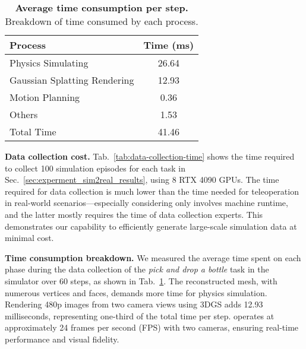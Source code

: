 \begin{table}[bt]
    \caption{\textbf{Average time consumption per step.} Breakdown of time consumed by each process. 
    }
    \label{tab:time_consumed}
    \centering
    \begin{tabular}{lc}
    \toprule
         Process & Time (ms) \\
    \midrule
         Physics Simulating & 26.64\\
         Gaussian Splatting Rendering & 12.93\\
         Motion Planning& 0.36\\
         Others & 1.53\\
         Total Time & 41.46 \\
    \bottomrule
    \end{tabular}
\end{table}

\noindent\textbf{Data collection cost.} Tab.~\ref{tab:data-collection-time} shows the time required to collect 100 simulation episodes for each task in Sec.~\ref{sec:experment_sim2real_results}, using 8 RTX 4090 GPUs.
The time required for data collection is much lower than the time needed for teleoperation in real-world scenarios—especially considering \our only involves machine runtime, and the latter mostly requires the time of data collection experts. This demonstrates our capability to efficiently generate large-scale simulation data at minimal cost.

\noindent\textbf{Time consumption breakdown.} We measured the average time spent on each phase during the data collection of the \textit{pick and drop a bottle} task in the simulator over 60 steps, as shown in Tab.~\ref{tab:time_consumed}. 
The reconstructed mesh, with numerous vertices and faces, demands more time for physics simulation. 
Rendering 480p images from two camera views using 3DGS adds 12.93 milliseconds, representing one-third of the total time per step. \our operates at approximately 24 frames per second (FPS) with two cameras, ensuring real-time performance and visual fidelity.
